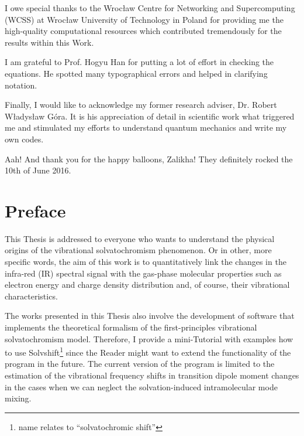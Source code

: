 \documentclass[a4paper,titlepage,twoside,fleqn,12pt]{book}
\begin{document}
{I owe special thanks to the Wroc{\l}aw Centre for Networking and Supercomputing
(WCSS) at Wroc{\l}aw University of Technology in Poland for providing me 
the high\hyp{}quality computational resources which contributed tremendously
for the results within this Work.

I am grateful to Prof. Hogyu Han for putting a lot of effort in checking
the equations. He spotted many typographical errors and helped
in clarifying notation.

Finally, I would like to acknowledge my former research adviser, Dr. Robert W{\l}adys{\l}aw G{\'o}ra.
It is his appreciation of detail in scientific work what triggered me and stimulated
my efforts to understand quantum mechanics and write my own codes.

Aah! And thank you for the happy balloons, Zalikha! They definitely rocked the 10th of June 2016.


}
\chapter{Preface}

This Thesis is addressed to everyone who wants to understand the physical
origins of the vibrational solvatochromism phenomenon. Or in other, more specific words, 
the aim of this work is to quantitatively link the changes in the infra\hyp{}red (IR)
spectral signal with the gas\hyp{}phase molecular properties such as electron energy and charge
density distribution and, of course, their vibrational characteristics. 

The works presented in this Thesis also involve the development of software
that implements the theoretical formalism of the first\hyp{}principles vibrational solvatochromism model.
Therefore, I provide a mini\hyp{}Tutorial with examples how to use {\sc Solvshift}\footnote{name relates to 
``solvatochromic shift''} 
since the Reader might want to extend the functionality of the program in the future.
The current version of the program is limited to the estimation of the vibrational frequency 
shifts in transition dipole moment changes in the cases when we can 
neglect the solvation\hyp{}induced intramolecular mode mixing.
\tableofcontents
\mainmatter
\end{document}
